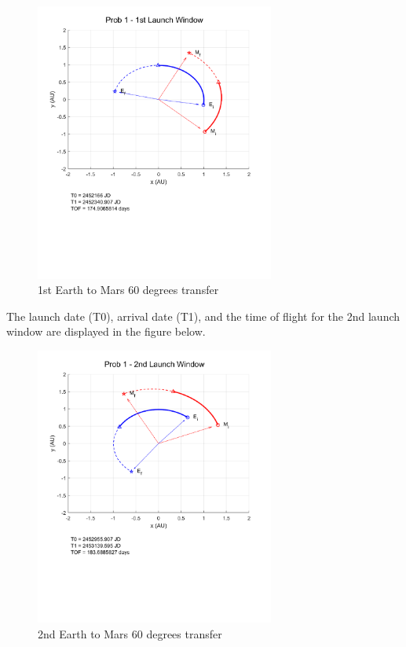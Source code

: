 \documentclass[conf]{new-aiaa}
\begin{document}
\begin{figure}[H]
    \centering 
    \includegraphics[width=0.7\textwidth]{Prob 1 - 1st Launch Window.pdf}
    \caption{1st Earth to Mars 60 degrees transfer}
\end{figure}

The launch date (T0), arrival date (T1), and the time of flight for the 2nd launch window are displayed in the figure below. 

\begin{figure}[H]
    \centering 
    \includegraphics[width=0.7\textwidth]{Prob 1 - 2nd Launch Window.pdf}
    \caption{2nd Earth to Mars 60 degrees transfer}
\end{figure}
\end{document}
